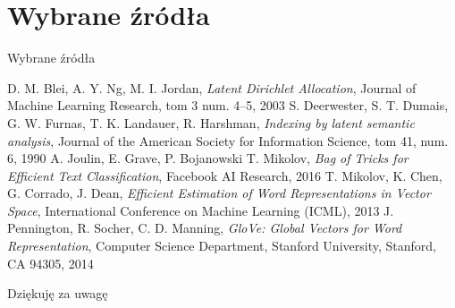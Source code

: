 \documentclass{beamer}
\begin{document}
	\section{Wybrane źródła}
	\begin{frame}{Wybrane źródła}
		\begin{thebibliography}{30}
				D. M. Blei, A. Y. Ng, M. I. Jordan,
				\emph{Latent Dirichlet Allocation},
				Journal of Machine Learning Research, tom 3 num. 4–5,
				2003
				S. Deerwester, S. T. Dumais, G. W. Furnas, T. K. Landauer, R. Harshman,
				\emph{Indexing by latent semantic analysis},
				Journal of the American Society for Information Science, tom 41, num. 6,
				1990
				A. Joulin, E. Grave, P. Bojanowski T. Mikolov,
				\emph{Bag of Tricks for Efficient Text Classification},
				Facebook AI Research,
				2016
				T. Mikolov, K. Chen, G. Corrado, J. Dean,
				\emph{Efficient Estimation of Word Representations in Vector Space},
				International Conference on Machine Learning (ICML),
				2013
				J. Pennington, R. Socher, C. D. Manning,
				\emph{GloVe: Global Vectors for Word Representation},
				Computer Science Department, Stanford University, Stanford, CA 94305,
				2014
		\end{thebibliography}
	\end{frame}
	\begin{frame}{}
		Dziękuję za uwagę
	\end{frame}
\end{document}
